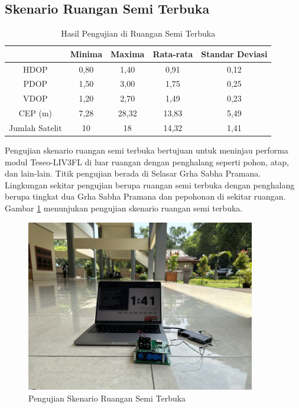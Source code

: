 \subsection{Skenario Ruangan Semi Terbuka}
\begin{table}[H]
	\caption{Hasil Pengujian di Ruangan Semi Terbuka}
	\vspace{0.5em}
	\centering
	\begin{tabular}{ccccc}
		\hline
		& \textbf{Minima} & \textbf{Maxima} & \textbf{Rata-rata} & \textbf{Standar Deviasi}\\
		\hline 
		HDOP & 0,80 & 1,40 & 0,91 & 0,12\\
		PDOP & 1,50	& 3,00 & 1,75 & 0,25\\
		VDOP & 1,20	& 2,70 & 1,49 & 0,23\\
		CEP (m) & 7,28	& 28,32 & 13,83 & 5,49\\
		Jumlah Satelit & 10 & 18 & 14,32 & 1,41\\
		\hline
	\end{tabular}
	\label{Tab: semioutdoor-table}
\end{table}

Pengujian skenario ruangan semi terbuka bertujuan untuk meninjau performa modul Teseo-LIV3FL di luar ruangan dengan penghalang seperti pohon, atap, dan lain-lain. Titik pengujian berada di Selasar Grha Sabha Pramana. Lingkungan sekitar pengujian berupa ruangan semi terbuka dengan penghalang berupa tingkat dua Grha Sabha Pramana dan pepohonan di sekitar ruangan. Gambar \ref{Fig: semioutdoor-keadaan} menunjukan pengujian skenario ruangan semi terbuka.

\begin{figure}[H]
	\centering
	\includegraphics[width=10cm]{contents/chapter-4/3-skenario-semioutdoor/keadaan.jpeg}
	\caption{Pengujian Skenario Ruangan Semi Terbuka}
	\label{Fig: semioutdoor-keadaan}
\end{figure}

